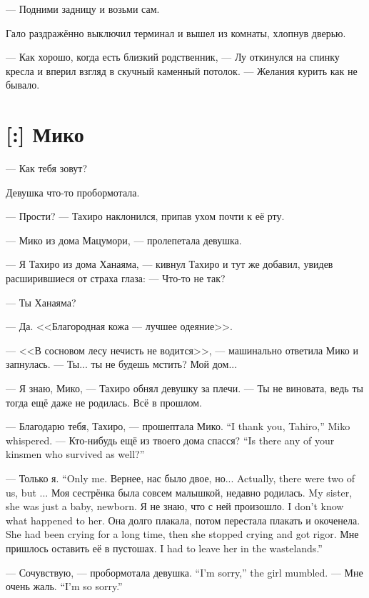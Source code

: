 --- Подними задницу и возьми сам.

Гало раздражённо выключил терминал и вышел из комнаты, хлопнув дверью.

--- Как хорошо, когда есть близкий родственник, --- Лу откинулся на спинку кресла и вперил взгляд в скучный каменный потолок.
--- Желания курить как не бывало.

\section{[:] Мико}

\textspace

--- Как тебя зовут?

Девушка что-то пробормотала.

--- Прости? --- Тахиро наклонился, припав ухом почти к её рту.

--- Мико из дома Мацумори, --- пролепетала девушка.

--- Я Тахиро из дома Ханаяма, --- кивнул Тахиро и тут же добавил, увидев расширившиеся от страха глаза:
--- Что-то не так?

--- Ты Ханаяма?

--- Да.
<<Благородная кожа --- лучшее одеяние>>.

--- <<В сосновом лесу нечисть не водится>>, --- машинально ответила Мико и запнулась.
--- Ты... ты не будешь мстить?
Мой дом...

--- Я знаю, Мико, --- Тахиро обнял девушку за плечи.
--- Ты не виновата, ведь ты тогда ещё даже не родилась.
Всё в прошлом.

{--- Благодарю тебя, Тахиро, --- прошептала Мико.}
{``I thank you, Tahiro,'' Miko whispered.}
{--- Кто-нибудь ещё из твоего дома спасся?}
{``Is there any of your kinsmen who survived as well?''}

{--- Только я.}
{``Only me.}
{Вернее, нас было двое, но...}
{Actually, there were two of us, but ...}
{Моя сестрёнка была совсем малышкой, недавно родилась.}
{My sister, she was just a baby, newborn.}
{Я не знаю, что с ней произошло.}
{I don't know what happened to her.}
{Она долго плакала, потом перестала плакать и окоченела.}
{She had been crying for a long time, then she stopped crying and got rigor.}
{Мне пришлось оставить её в пустошах.}
{I had to leave her in the wastelands.''}

{--- Сочувствую, --- пробормотала девушка.}
{``I'm sorry,'' the girl mumbled.}
{--- Мне очень жаль.}
{``I'm so sorry.''}


